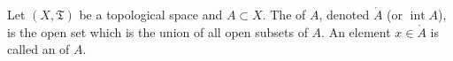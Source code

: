Let $(X, \mathfrak{T})$ be a topological space and $A \subset X$. The  of $A$, denoted $\mathring{A}$ (or $\operatorname{int} A$), is the open set which is the union of all open subsets of $A$. An element $x \in \mathring{A}$ is called an  of $A$.
